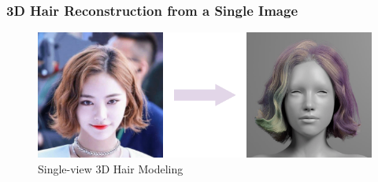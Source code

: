 \begin{frame}
    \frametitle{3D Hair Reconstruction from a Single Image}
    \begin{figure}[H]
        \centering
        \includegraphics[width=0.8\linewidth]{assets/figures/task-intro.png}
        \caption{Single-view 3D Hair Modeling}
        \label{fig:task-intro}
    \end{figure}
\end{frame}